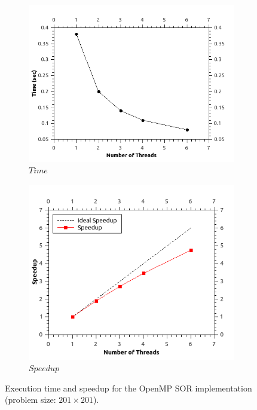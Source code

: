 \documentclass[11pt]{report}
\begin{document}
\begin{figure}[th!]
\centering
\begin{subfigure}{0.45\textwidth}
  \centering
  \includegraphics[width=1.0\linewidth]{images/sor_time_201}
  \caption{$Time$}
\end{subfigure}
\begin{subfigure}{0.45\textwidth}
  \centering
  \includegraphics[width=1.0\linewidth]{images/sor_speedup_201}
  \caption{$Speedup$}
\end{subfigure}
\caption{Execution time and speedup for the OpenMP SOR implementation (problem size: $201 \times 201$). }
\label{fig:example5.7}
\end{figure}
\end{document}

